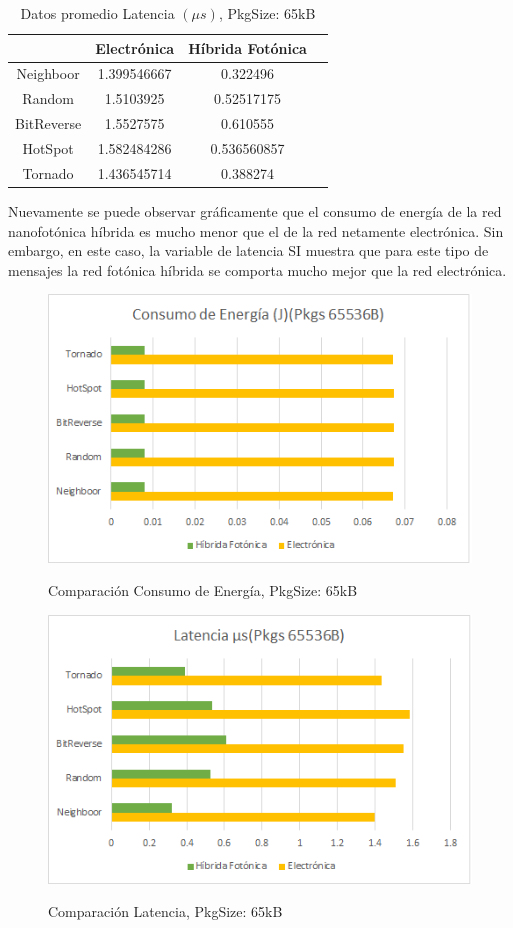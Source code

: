 \begin{table}[H]
\centering
\begin{tabular}{|c|c|c|c|}
\hline
&Electrónica&Híbrida Fotónica\\
\hline
Neighboor&1.399546667&0.322496\\
Random&1.5103925&0.52517175\\
BitReverse&1.5527575&0.610555\\
HotSpot&1.582484286&0.536560857\\
Tornado&1.436545714&0.388274\\
\hline
\end{tabular}
\caption{Datos promedio Latencia $(\mu s)$, PkgSize: 65kB}
\label{tb:lall65k}
\end{table}

Nuevamente se puede observar gráficamente que el consumo de energía de la red
nanofotónica híbrida es mucho menor que el de la red netamente electrónica.
Sin embargo, en este caso, la variable de latencia SI muestra que 
para este tipo de mensajes la red fotónica híbrida se comporta mucho mejor 
que la red electrónica.

\begin{figure}[H]
\caption{Comparación Consumo de Energía, PkgSize: 65kB}
\centering
\includegraphics[width=1.0\textwidth,natwidth=483,natheight=306]{figs/E65k.png}
\label{fig:e65k}
\end{figure} 

\begin{figure}[H]
\caption{Comparación Latencia, PkgSize: 65kB}
\centering
\includegraphics[width=1.0\textwidth,natwidth=483,natheight=306]{figs/L65k.png}
\label{fig:l65k}
\end{figure} 

